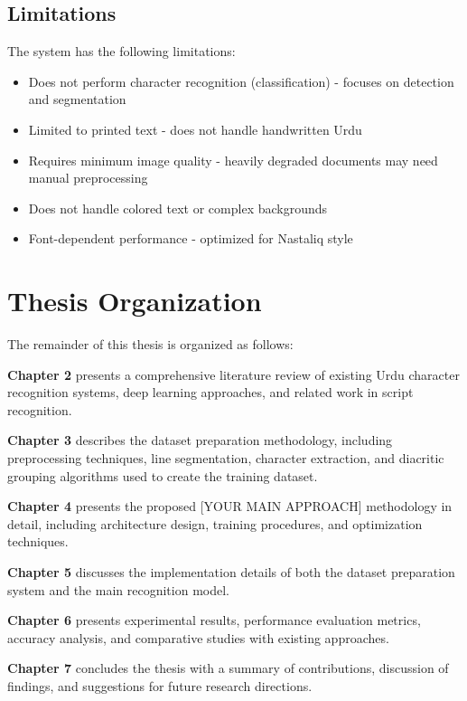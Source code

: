 \documentclass[12pt,a4paper,oneside]{report}
\begin{document}
\subsection{Limitations}
The system has the following limitations:
\begin{itemize}
    \item Does not perform character recognition (classification) - focuses on detection and segmentation
    \item Limited to printed text - does not handle handwritten Urdu
    \item Requires minimum image quality - heavily degraded documents may need manual preprocessing
    \item Does not handle colored text or complex backgrounds
    \item Font-dependent performance - optimized for Nastaliq style
\end{itemize}

\section{Thesis Organization}

The remainder of this thesis is organized as follows:

\textbf{Chapter 2} presents a comprehensive literature review of existing Urdu character recognition systems, deep learning approaches, and related work in script recognition.

\textbf{Chapter 3} describes the dataset preparation methodology, including preprocessing techniques, line segmentation, character extraction, and diacritic grouping algorithms used to create the training dataset.

\textbf{Chapter 4} presents the proposed [YOUR MAIN APPROACH] methodology in detail, including architecture design, training procedures, and optimization techniques.

\textbf{Chapter 5} discusses the implementation details of both the dataset preparation system and the main recognition model.

\textbf{Chapter 6} presents experimental results, performance evaluation metrics, accuracy analysis, and comparative studies with existing approaches.

\textbf{Chapter 7} concludes the thesis with a summary of contributions, discussion of findings, and suggestions for future research directions.

\end{document}
